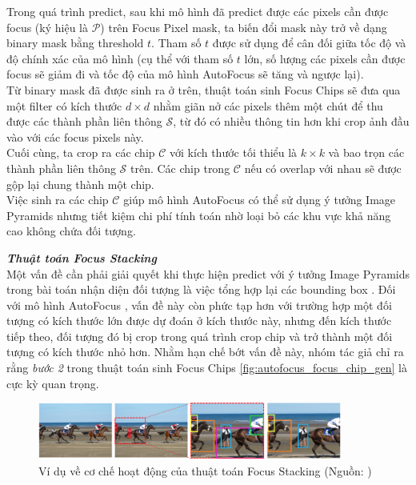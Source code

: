 {    \noindent
    Trong quá trình predict, sau khi mô hình đã predict được các pixels  cần được focus (ký hiệu là $\mathcal{P}$) trên Focus Pixel  mask, ta biến đổi mask này trở về dạng binary mask bằng threshold $t$.
    Tham số $t$ được sử dụng để cân đối giữa tốc độ và độ chính xác của mô hình (cụ thể với tham số $t$ lớn, số lượng các pixels  cần được focus sẽ giảm đi và tốc độ của mô hình AutoFocus  sẽ tăng và ngược lại). \\
    Từ binary mask đã được sinh ra ở trên, thuật toán sinh Focus Chips sẽ đưa qua một filter có kích thước $d \times d$ nhằm giãn nở các pixels  thêm một chút để thu được các thành phần liên thông $\mathcal{S}$, từ đó có nhiều thông tin hơn khi crop ảnh đầu vào với các focus pixels  này. \\
    Cuối cùng, ta crop ra các chip $\mathcal{C}$ với kích thước tối thiểu là $k \times k$ và bao trọn các thành phần liên thông $\mathcal{S}$ trên.
    Các chip trong $\mathcal{C}$ nếu có overlap với nhau sẽ được gộp lại chung thành một chip. \\
    Việc sinh ra các chip $\mathcal{C}$ giúp mô hình AutoFocus  có thể sử dụng ý tưởng Image Pyramids nhưng tiết kiệm chi phí tính toán nhờ loại bỏ các khu vực khả năng cao không chứa đối tượng.

    \noindent
    \textbf{\textit{Thuật toán Focus Stacking}} \\
    Một vấn đề cần phải giải quyết khi thực hiện predict với ý tưởng Image Pyramids trong bài toán nhận diện đối tượng  là việc tổng hợp lại các bounding box .
    Đối với mô hình AutoFocus , vấn đề này còn phức tạp hơn với trường hợp một đối tượng có kích thước lớn được dự đoán ở kích thước này, nhưng đến kích thước tiếp theo, đối tượng đó bị crop trong quá trình crop chip và trở thành một đối tượng có kích thước nhỏ hơn.
    Nhằm hạn chế bớt vấn đề này, nhóm tác giả chỉ ra rằng \textit{bước 2} trong thuật toán sinh Focus Chips \ref{fig:autofocus_focus_chip_gen} là cực kỳ quan trọng.

    \begin{figure}[H]
        \centering
        \includegraphics[width=10cm] {images/autofocus_focus_stack}
        \caption{Ví dụ về cơ chế hoạt động của thuật toán Focus Stacking (Nguồn: \cite{najibi2019autofocus})}
        \label{fig:autofocus_focus_stack}
    \end{figure}

}

